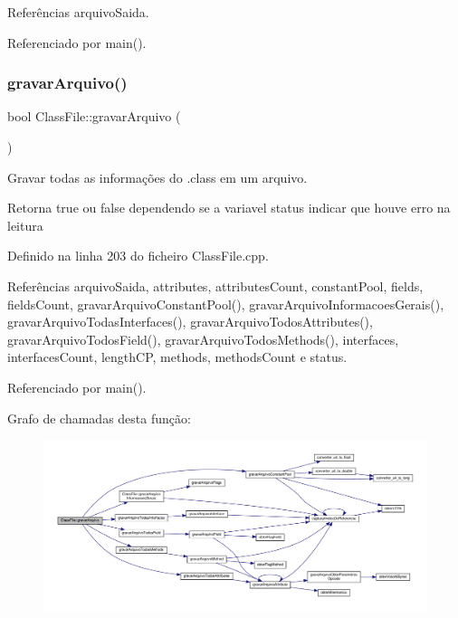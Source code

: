 Referências arquivo\+Saida.



Referenciado por main().

\mbox{\label{classClassFile_a452169cb59d63012f98a34a3fff2c2f7}} 
\subsubsection{\texorpdfstring{gravar\+Arquivo()}{gravarArquivo()}}
{\footnotesize\ttfamily bool Class\+File\+::gravar\+Arquivo (\begin{DoxyParamCaption}{ }\end{DoxyParamCaption})}



Gravar todas as informações do .class em um arquivo. 

\begin{DoxyReturn}{Retorna}
true ou false dependendo se a variavel status indicar que houve erro na leitura 
\end{DoxyReturn}


Definido na linha 203 do ficheiro Class\+File.\+cpp.



Referências arquivo\+Saida, attributes, attributes\+Count, constant\+Pool, fields, fields\+Count, gravar\+Arquivo\+Constant\+Pool(), gravar\+Arquivo\+Informacoes\+Gerais(), gravar\+Arquivo\+Todas\+Interfaces(), gravar\+Arquivo\+Todos\+Attributes(), gravar\+Arquivo\+Todos\+Field(), gravar\+Arquivo\+Todos\+Methods(), interfaces, interfaces\+Count, length\+CP, methods, methods\+Count e status.



Referenciado por main().

Grafo de chamadas desta função\+:
\nopagebreak
\begin{figure}[H]
\begin{center}
\leavevmode
\includegraphics[width=350pt]{classClassFile_a452169cb59d63012f98a34a3fff2c2f7_cgraph}
\end{center}
\end{figure}
\mbox{\label{classClassFile_a4a685afd10dc5aaacd5a71ed535895c6}} 
